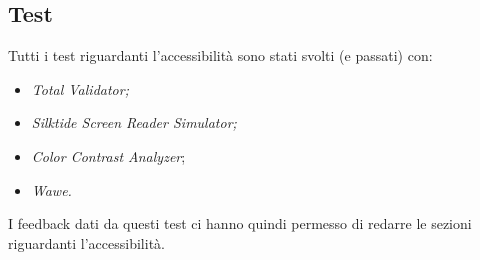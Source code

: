 \begin{center}
\end{center}
\subsection{Test}

Tutti i test riguardanti l’accessibilità sono stati svolti (e passati) con:
\begin{itemize}
\item \textit{Total Validator;}
\item \textit{Silktide Screen Reader Simulator;}
\item \textit{Color Contrast Analyzer};
\item \textit{Wawe.}
\end{itemize}

I feedback dati da questi test ci hanno quindi permesso di redarre le sezioni riguardanti l'accessibilità.

